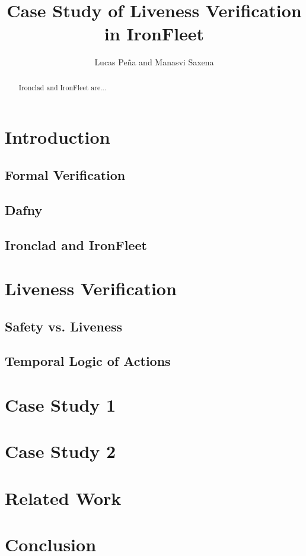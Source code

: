 \documentclass{llncs}
\begin{document}
%
\mainmatter              %
%
\title{Case Study of Liveness Verification in IronFleet}
%
\author{Lucas Pe\~{n}a and Manasvi Saxena}
%

\maketitle              %

\begin{abstract}
Ironclad \cite{ironclad} and IronFleet \cite{ironfleet} are...
\end{abstract}
%
\section{Introduction}
\subsection{Formal Verification}
\subsection{Dafny}
\subsection{Ironclad and IronFleet}
%
\section{Liveness Verification}
\subsection{Safety vs. Liveness}
\subsection{Temporal Logic of Actions}
%
\section{Case Study 1}
%
\section{Case Study 2}
%
\section{Related Work}
%
\section{Conclusion}

%
%



\end{document}
